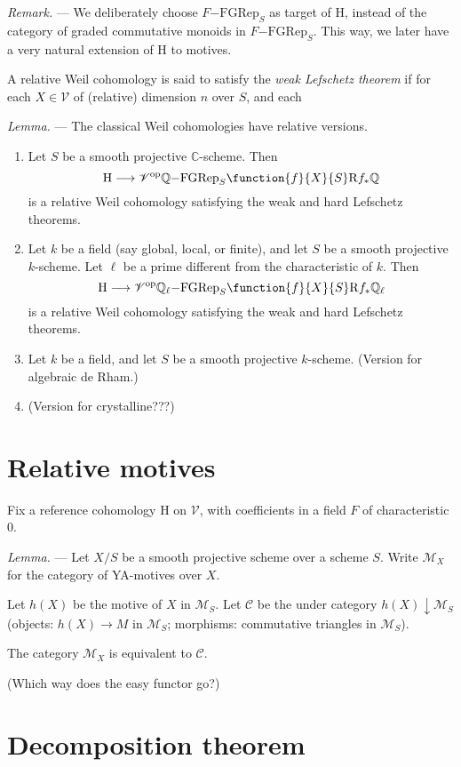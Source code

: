 \documentclass[a4paper,10pt]{article}
\newenvironment{lemma}{\textit{Lemma.} --- }{}
\newenvironment{remark}{\textit{Remark.} --- }{}
\def\basepieces{\mathscr{V}}
\newcommand{\fgrep}[2]{#1\mathrm{-FGRep}_{#2}}
\def\coh{\mathrm{H}}
\begin{document}
\begin{remark} %
	We deliberately choose $\fgrep{F}{S}$ as target of $\coh$, instead of
	the category of graded commutative monoids in $\fgrep{F}{S}$. This way,
	we later have a very natural extension of $\coh$ to motives.
\end{remark} %

A relative Weil cohomology is said to satisfy the \emph{weak Lefschetz theorem}
if for each $X \in \basepieces$ of (relative) dimension $n$ over $S$, and each


\begin{lemma} %
	The classical Weil cohomologies have relative versions.
	\begin{enumerate} %
		\item Let $S$ be a smooth projective $\mathbb{C}$-scheme. Then
			\[
				\map{\coh}%
				{\basepieces^{\mathrm{op}}}%
				{\fgrep{\mathbb{Q}}{S}}%
				{\function{f}{X}{S}}%
				{\mathrm{R}f_{*}\mathbb{Q}}
			\]
			is a relative Weil cohomology satisfying the weak and
			hard Lefschetz theorems.
		\item Let $k$ be a field (say global, local, or finite), and
			let $S$ be a smooth projective $k$-scheme. Let $\ell$
			be a prime different from the characteristic of $k$.
			Then
			\[
				\map{\coh}%
				{\basepieces^{\mathrm{op}}}%
				{\fgrep{\mathbb{Q_{\ell}}}{S}}%
				{\function{f}{X}{S}}%
				{\mathrm{R}f_{*}\mathbb{Q}_{\ell}}
			\]
			is a relative Weil cohomology satisfying the weak and
			hard Lefschetz theorems.
		\item Let $k$ be a field, and let $S$ be a smooth projective
			$k$-scheme. (Version for algebraic de Rham.)
		\item (Version for crystalline???)
	\end{enumerate} %
\end{lemma} %

\section{Relative motives}

Fix a reference cohomology $\coh$ on $\basepieces$, with coefficients in a
field $F$ of characteristic $0$.

\begin{lemma} %
	Let $X/S$ be a smooth projective scheme over a scheme $S$. Write
	$\mathcal{M}_{X}$ for the category of YA-motives over $X$.

	Let $h(X)$ be the motive of $X$ in $\mathcal{M}_{S}$. Let $\mathcal{C}$
	be the under category $h(X) \downarrow \mathcal{M}_{S}$ (objects: $h(X)
	\to M$ in $\mathcal{M}_{S}$; morphisms: commutative triangles in
	$\mathcal{M}_{S}$).

	The category $\mathcal{M}_{X}$ is equivalent to $\mathcal{C}$.
	
	(Which way does the easy functor go?)
\end{lemma} %


\section{Decomposition theorem}
\end{document}

